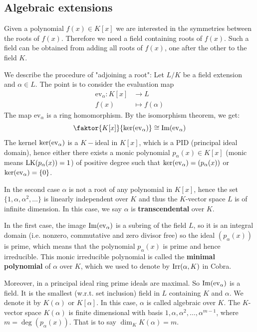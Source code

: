 \documentclass[twoside = false,	%
		headsepline,		%
		parskip = true,
		]{scrbook}						%
\begin{document}
    \subsection{Algebraic extensions}
        Given a polynomial $f(x) \in K[x]$ we are interested in the symmetries between the roots of $f(x)$. Therefore we need a field containing roots of $f(x)$. Such a field can be obtained from adding all roots of $f(x)$, one after the other to the field $K$.
        
        We describe the procedure of "adjoining a root":
        Let $L/K$ be a field extension and $\alpha \in L$. The point is to consider the evaluation map
        \begin{align*}
            \mathrm{ev}_\alpha: K[x] &\rightarrow L \\
                                f(x) &\mapsto f(\alpha)
        \end{align*}
        The map $\mathrm{ev}_\alpha$ is a ring homomorphism. By the isomorphism theorem, we get:
        \begin{equation*}
            \faktor{K[x]}{\Ker(\ev_\alpha)} \cong \Img(\ev_\alpha)
        \end{equation*}
        The kernel $\ker(\mathrm{ev}_\alpha)$ is a $K-$ideal in $K[x]$, which is a PID (principal ideal domain), hence either there exists a monic polynomial $p_\alpha(x) \in K[x]$ (monic means $\mathrm{LK}(p_\alpha(x))=1$) of positive degree such that $\mathrm{ker}(\mathrm{ev}_\alpha) = (p_\alpha(x))$ or $\ker(\mathrm{ev}_\alpha) = \{0\}$.
        
        In the second case $\alpha$ is not a root of any polynomial in $K[x]$, hence the set $\{1,\alpha,\alpha^2,\dots\}$ is linearly independent over $K$ and thus the $K$-vector space $L$ is of infinite dimension. In this case, we say $\alpha$ is \textbf{transcendental} over $K$.
        
        In the first case, the image $\mathrm{Im}(\mathrm{ev}_\alpha)$ is a subring of the field $L$, so it is an integral domain (i.e. nonzero, commutative and zero divisor free) so the ideal $(p_\alpha(x))$ is prime, which means that the polynomial $p_\alpha(x)$ is prime and hence irreducible. This monic irreducible polynomial is called the \textbf{minimal polynomial} of $\alpha$ over $K$, which we used to denote by $\mathrm{Irr}(\alpha,K)$ in Cobra.
        
        Moreover, in a principal ideal ring prime ideals are maximal. So $\mathrm{Im}(\mathrm{ev}_\alpha)$ is a field. It is the smallest (w.r.t. set inclusion) field in $L$ containing $K$ and $\alpha$. We denote it by $K(\alpha)$ or $K[\alpha]$. In this case, $\alpha$ is called algebraic over $K$. The $K$-vector space $K(\alpha)$ is finite dimensional with basis $1,\alpha,\alpha^2,\dots,\alpha^{m-1}$, where $m=\deg\left(p_\alpha(x)\right)$. That is to say $\dim_K K(\alpha) = m$.
        
\end{document}
